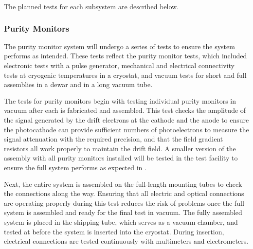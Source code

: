 The planned tests for each subsystem are described below.  


\subsubsection{Purity Monitors}
\label{sec:fdgen-slow-cryo-qc-pm}


The purity monitor system will undergo a series of tests to ensure the
system performs as intended. These tests reflect the 
purity monitor  tests, which included electronic tests
with a pulse generator, mechanical and electrical connectivity tests
at cryogenic temperatures in a cryostat, and vacuum tests for short
and full assemblies in a dewar and in a long vacuum tube.

The  tests for  purity monitors begin with testing
individual purity monitors in vacuum after each is fabricated and
assembled.  This test checks the amplitude of the signal generated by
the drift electrons at the cathode and the anode to ensure the
photocathode can provide sufficient numbers of photoelectrons to
measure the signal attenuation
with the required precision, and that the field gradient resistors all work properly to maintain the drift field. %
A smaller version of the assembly with all purity monitors installed will be  tested in the \lar test facility to ensure the full system performs as expected in \lar.  

Next, %
the entire system %
is assembled on the full-length mounting tubes to check the connections along the way.  Ensuring that all electric and optical connections are operating properly during this test reduces the risk of problems once the full system is assembled and ready for the final test in vacuum.  %
The fully assembled system %
is placed in the shipping tube, which %
serves as a vacuum chamber, and tested at \surf %
 before the system is inserted into the  %
 cryostat. During insertion, electrical connections %
 are tested continuously with multimeters and electrometers. %



